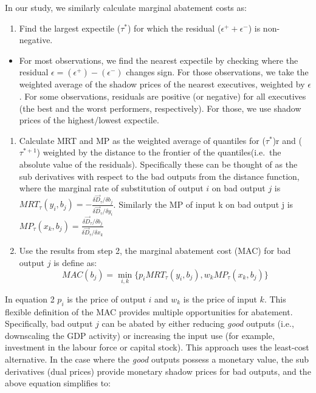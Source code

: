 \documentclass[
  10pt,
]{article}
\providecommand{\tightlist}{%
  \setlength{\itemsep}{0pt}\setlength{\parskip}{0pt}}
\begin{document}
In our study, we similarly calculate marginal abatement costs as:

\begin{enumerate}
\def\labelenumi{\arabic{enumi}.}
\tightlist
\item
  Find the largest expectile (\(\tau^{*}\)) for which the residual
  (\(\epsilon^+ + \epsilon^-\)) is non-negative.
\end{enumerate}

\begin{itemize}
\tightlist
\item
  For most observations, we find the nearest expectile by checking where
  the residual \(\epsilon = (\epsilon^+) - (\epsilon^-)\) changes sign.
  For those observations, we take the weighted average of the shadow
  prices of the nearest executives, weighted by \(\epsilon\). For some
  observations, residuals are positive (or negative) for all executives
  (the best and the worst performers, respectively). For those, we use
  shadow prices of the highest/lowest expectile.
\end{itemize}

\begin{enumerate}
\def\labelenumi{\arabic{enumi}.}
\setcounter{enumi}{1}
\item
  Calculate MRT and MP as the weighted average of quantiles for
  (\(\tau^{*}\))r and (\(\tau^{*+1}\)) weighted by the distance to the
  frontier of the quantiles(i.e.~the absolute value of the residuals).
  Specifically these can be thought of as the sub derivatives with
  respect to the bad outputs from the distance function, where the
  marginal rate of substitution of output \(i\) on bad output \(j\) is
  \(MRT_{\tau}(y_{i},b_{j})=-\frac{\delta \vec{D}_{\tau}/\delta b_{j}}{\delta \vec{D}_{\tau}/\delta y_{i}}\).
  Similarly the MP of input k on bad output j is
  \(MP_{\tau}(x_{k},b_{j})=\frac{\delta \vec{D}_{\tau}/\delta b_{j}}{\delta \vec{D}_{\tau}/\delta x_{k}}\)
\item
  Use the results from step 2, the marginal abatement cost (MAC) for bad
  output \(j\) is define as: \begin{equation}
  MAC(b_{j})=\displaystyle \min_{i,k}\{p_{i}MRT_{\tau}(y_{i},b_{j}), w_{k}MP_{\tau}(x_{k},b_{j})\}
  \end{equation}
\end{enumerate}

In equation 2 \(p_{i}\) is the price of output \(i\) and \(w_{k}\) is
the price of input \(k\). This flexible definition of the MAC provides
multiple opportunities for abatement. Specifically, bad output \(j\) can
be abated by either reducing \emph{good} outputs (i.e., downscaling the
GDP activity) or increasing the input use (for example, investment in
the labour force or capital stock). This approach uses the least-cost
alternative. In the case where the \emph{good} outputs possess a
monetary value, the sub derivatives (dual prices) provide monetary
shadow prices for bad outputs, and the above equation simplifies to:
\end{document}
